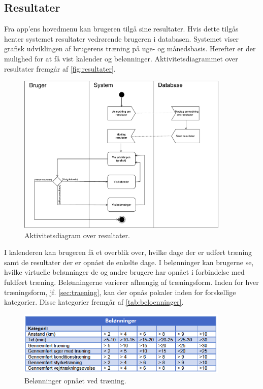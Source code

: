 \subsection{Resultater}
Fra app'ens hovedmenu kan brugeren tilgå sine resultater. Hvis dette tilgås henter systemet resultater vedrørende brugeren i databasen. Systemet viser grafisk udviklingen af brugerens træning på uge- og månedsbasis. Herefter er der mulighed for at få vist kalender og belønninger. Aktivitetsdiagrammet over resultater fremgår af \autoref{fig:resultater}.

\begin{figure} [H]
\centering
\includegraphics[width=0.9\textwidth]{figures/aktivitetsdiagram/Resultater}
\caption{Aktivitetsdiagram over resultater.}
\label{fig:resultater}
\end{figure}

\noindent
I kalenderen kan brugeren få et overblik over, hvilke dage der er udført træning samt de resultater der er opnået de enkelte dage. I belønninger kan brugerne se, hvilke virtuelle belønninger de og andre brugere har opnået i forbindelse med fuldført træning. Belønningerne varierer afhængig af træningsform. Inden for hver træningsform, jf. \autoref{sec:traening}, kan der opnås pokaler inden for forskellige kategorier. Disse kategorier fremgår af \autoref{tab:beloenninger}.

\begin{figure} [H]
\centering
\includegraphics[width=0.9\textwidth]{figures/aktivitetsdiagram/beloeninnger}
\caption{Belønninger opnået ved træning.}
\label{tab:beloenninger}
\end{figure}
 

